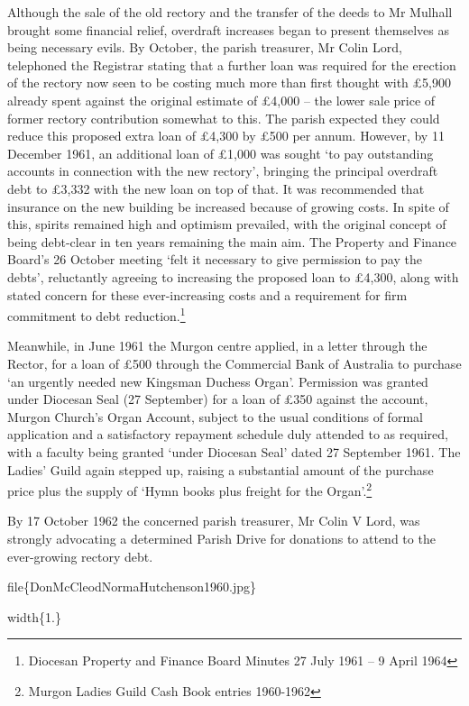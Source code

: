 Although the sale of the old rectory and the transfer of the deeds to Mr Mulhall brought some financial relief, overdraft increases began to present themselves as being necessary evils. By October, the parish treasurer, Mr Colin Lord, telephoned the Registrar stating that a further loan was required for the erection of the rectory now seen to be costing much more than first thought with £5,900 already spent against the original estimate of £4,000 -- the lower sale price of former rectory contribution somewhat to this. The parish expected they could reduce this proposed extra loan of £4,300 by £500 per annum. However, by 11 December 1961, an additional loan of £1,000 was sought `to pay outstanding accounts in connection with the new rectory', bringing the principal overdraft debt to £3,332 with the new loan on top of that. It was recommended that insurance on the new building be increased because of growing costs. In spite of this, spirits remained high and optimism prevailed, with the original concept of being debt-clear in ten years remaining the main aim. The Property and Finance Board's 26 October meeting `felt it necessary to give permission to pay the debts', reluctantly agreeing to increasing the proposed loan to £4,300, along with stated concern for these ever-increasing costs and a requirement for firm commitment to debt reduction.\footnote{Diocesan Property and Finance Board Minutes 27 July 1961 -- 9 April 1964}

Meanwhile, in June 1961 the Murgon centre applied, in a letter through the Rector, for a loan of £500 through the Commercial Bank of Australia to purchase `an urgently needed new Kingsman Duchess Organ'. Permission was granted under Diocesan Seal (27 September) for a loan of £350 against the account, Murgon Church's Organ Account, subject to the usual conditions of formal application and a satisfactory repayment schedule duly attended to as required, with a faculty being granted `under Diocesan Seal' dated 27 September 1961. The Ladies' Guild again stepped up, raising a substantial amount of the purchase price plus the supply of `Hymn books plus freight for the Organ'.\footnote{Murgon Ladies Guild Cash Book entries 1960-1962}

By 17 October 1962 the concerned parish treasurer, Mr Colin V Lord, was strongly advocating a determined Parish Drive for donations to attend to the ever-growing rectory debt.

file\{DonMcCleodNormaHutchenson1960.jpg\}

width\{1.\}

